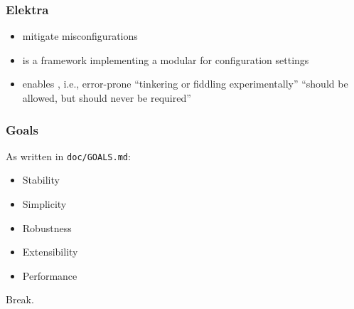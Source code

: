 \begin{frame}
	\frametitle{Elektra~\cite{raab2016elektra}}
	\begin{itemize}[<+->]
		\item {} mitigate misconfigurations
		\item \elektra{} is a framework implementing a modular  for configuration settings
		\item \elektra{} enables  \cite{holland2001nofutz},
			i.e., error-prone \enquote{tinkering or fiddling experimentally} \enquote{should be allowed, but should never be required}
	\end{itemize}
\end{frame}

\begin{frame}[fragile]
	\frametitle{Goals}

	As written in \verb+doc/GOALS.md+:

	\begin{itemize}
		\item Stability
		\item Simplicity
		\item Robustness
		\item Extensibility
		\item Performance
	\end{itemize}
\end{frame}

\begin{assignment}
	\begin{task}
	Break.
	\end{task}
\end{assignment}

